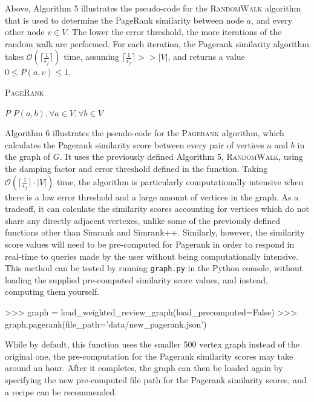 \documentclass[fontsize=11pt]{article}
\begin{document}
Above, Algorithm 5 illustrates the pseudo-code for the \textsc{RandomWalk} algorithm that is used to determine the PageRank similarity between node $a$, and every other node $v \in V$. The lower the error threshold, the more iterations of the random walk are performed. For each iteration, the Pagerank similarity algorithm takes $\mathcal{O}(\lceil \frac{1}{\epsilon_f} \rceil)$  time, assuming $\lceil \frac{1}{\epsilon_f} \rceil >> \lvert V \rvert$, and returns a value $0 \leq P(a, v) \leq 1$. 

\begin{algorithm}[H]
    \setcounter{AlgoLine}{0}
    \caption{\textsc{PageRank}}
    $P$\;
    \Return $P(a, b), \forall a \in V, \forall b \in V$
\end{algorithm}

Algorithm 6 illustrates the pseudo-code for the \textsc{Pagerank} algorithm, which calculates the Pagerank similarity score between every pair of vertices $a$ and $b$ in the graph of $G$. It uses the previously defined Algorithm 5, \textsc{RandomWalk}, using the damping factor and error threshold defined in the function. Taking $\mathcal{O}(\lceil \frac{1}{\epsilon_f} \rceil \cdot \lvert V \rvert)$ time, the algorithm is particularly computationally intensive when there is a low error threshold and a large amount of vertices in the graph. As a tradeoff, it can calculate the similarity scores accounting for vertices which do not share any directly adjacent vertexes, unlike some of the previously defined functions other than Simrank and Simrank++. Similarly, however, the similarity score values will need to be pre-computed for Pagerank in order to respond in real-time to queries made by the user without being computationally intensive. This method can be tested by running \texttt{graph.py} in the Python console, without loading the supplied pre-computed similarity score values, and instead, computing them yourself. 

\begin{python}
>>> graph = load_weighted_review_graph(load_precomputed=False)
>>> graph.pagerank(file_path='data/new_pagerank.json')
\end{python}

While by default, this function uses the smaller 500 vertex graph instead of the original one, the pre-computation for the Pagerank similarity scores may take around an hour. After it completes, the graph can then be loaded again by specifying the new pre-computed file path for the Pagerank similarity scores, and a recipe can be recommended.
\end{document}
